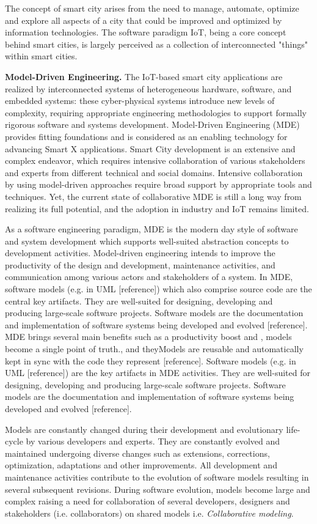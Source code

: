 The concept of smart city arises from the need to manage, automate, optimize and explore all aspects of a city that could be improved and optimized by information technologies. The software paradigm IoT, being a core concept behind smart cities, is largely perceived as a collection of interconnected "things" within smart cities. 

\textbf{Model-Driven Engineering.} The IoT-based smart city applications are realized by interconnected systems of heterogeneous hardware, software, and embedded systems: these cyber-physical systems introduce new levels of complexity, requiring appropriate engineering methodologies to support formally rigorous software and systems development. Model-Driven Engineering (MDE) provides fitting foundations and is considered as an enabling technology for advancing Smart X applications. Smart City development is an extensive and complex endeavor, which requires intensive collaboration of various stakeholders and experts from different technical and social domains. Intensive collaboration by using model-driven approaches require broad support by appropriate tools and techniques. Yet, the current state of collaborative MDE is still a long way from realizing its full potential, and the adoption in industry and IoT remains limited.

As a software engineering paradigm, MDE is the modern day style of software and system development which supports well-suited abstraction concepts to development activities. Model-driven engineering intends to improve the productivity of the design and develop­ment, maintenance activities, and communication among various actors and stakeholders of a system. In MDE, software models (e.g. in UML [reference]) which also comprise source code are the central key artifacts. They are well-suited for designing, developing and producing large-scale software projects. Software models are the documentation and implementation of software systems being developed and evolved [reference]. MDE brings several main benefits such as a productivity boost and , models become a single point of truth., and theyModels are reusable and automatically kept in sync with the code they represent [reference]. Software models (e.g. in UML [reference]) are the key artifacts in MDE activities. They are well-suited for designing, developing and producing large-scale software projects. Software models are the documentation and implementation of software systems being developed and evolved [reference].

Models are constantly changed during their development and evolutionary life-cycle by various developers and experts. They are constantly evolved and maintained undergoing diverse changes such as extensions, corrections, optimization, adaptations and other improvements. All development and maintenance activities contribute to the evolution of software models resulting in several subsequent revisions. During software evolution, models become large and complex raising a need for collaboration of several developers, designers and stakeholders (i.e. collaborators) on shared models i.e. \textit{Collaborative modeling}.

